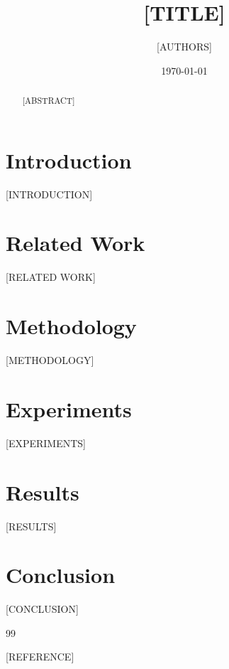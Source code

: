 \documentclass[11pt,a4paper]{article}
\title{[TITLE]}
\author{[AUTHORS]}
\date{\today}
\begin{document}
\maketitle

\begin{abstract}
[ABSTRACT]
\end{abstract}

\section{Introduction}

[INTRODUCTION]

\section{Related Work}

[RELATED WORK]

\section{Methodology}

[METHODOLOGY]

\section{Experiments}

[EXPERIMENTS]

\section{Results}

[RESULTS]

\section{Conclusion}

[CONCLUSION]


\begin{thebibliography}{99}

[REFERENCE]

\end{thebibliography}
\end{document}
